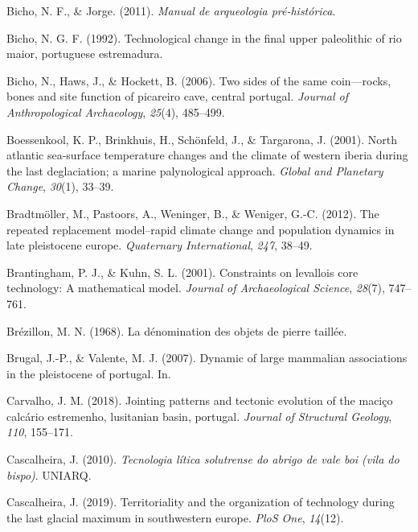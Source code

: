 \documentclass[12pt,twoside]{reedthesis}
\begin{document}
\leavevmode\hypertarget{ref-bicho2011}{}%
Bicho, N. F., \& Jorge. (2011). \emph{Manual de arqueologia pré-histórica}.

\leavevmode\hypertarget{ref-bicho1992}{}%
Bicho, N. G. F. (1992). Technological change in the final upper paleolithic of rio maior, portuguese estremadura.

\leavevmode\hypertarget{ref-bicho2006}{}%
Bicho, N., Haws, J., \& Hockett, B. (2006). Two sides of the same coin---rocks, bones and site function of picareiro cave, central portugal. \emph{Journal of Anthropological Archaeology}, \emph{25}(4), 485--499.

\leavevmode\hypertarget{ref-boessenkool2001}{}%
Boessenkool, K. P., Brinkhuis, H., Schönfeld, J., \& Targarona, J. (2001). North atlantic sea-surface temperature changes and the climate of western iberia during the last deglaciation; a marine palynological approach. \emph{Global and Planetary Change}, \emph{30}(1), 33--39.

\leavevmode\hypertarget{ref-bradtmoller2012}{}%
Bradtmöller, M., Pastoors, A., Weninger, B., \& Weniger, G.-C. (2012). The repeated replacement model--rapid climate change and population dynamics in late pleistocene europe. \emph{Quaternary International}, \emph{247}, 38--49.

\leavevmode\hypertarget{ref-brantingham2001}{}%
Brantingham, P. J., \& Kuhn, S. L. (2001). Constraints on levallois core technology: A mathematical model. \emph{Journal of Archaeological Science}, \emph{28}(7), 747--761.

\leavevmode\hypertarget{ref-brezillon1968}{}%
Brézillon, M. N. (1968). La dénomination des objets de pierre taillée.

\leavevmode\hypertarget{ref-brugal2007}{}%
Brugal, J.-P., \& Valente, M. J. (2007). Dynamic of large mammalian associations in the pleistocene of portugal. In.

\leavevmode\hypertarget{ref-carvalho2018}{}%
Carvalho, J. M. (2018). Jointing patterns and tectonic evolution of the maciço calcário estremenho, lusitanian basin, portugal. \emph{Journal of Structural Geology}, \emph{110}, 155--171.

\leavevmode\hypertarget{ref-cascalheira2010}{}%
Cascalheira, J. (2010). \emph{Tecnologia lítica solutrense do abrigo de vale boi (vila do bispo)}. UNIARQ.

\leavevmode\hypertarget{ref-cascalheira2019}{}%
Cascalheira, J. (2019). Territoriality and the organization of technology during the last glacial maximum in southwestern europe. \emph{PloS One}, \emph{14}(12).
\end{document}
